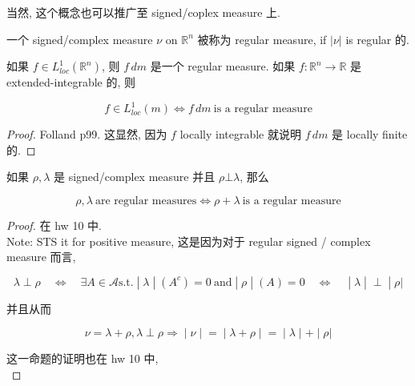 当然, 这个概念也可以推广至 signed/coplex measure 上.

\begin{definition}{}

一个 signed/complex measure \(\nu\) on \(\mathbb{R}^{n}\) 被称为 regular measure, if \(|\nu|\) is regular 的.

\end{definition}

\begin{lemma}

如果 \(f \in L_{loc}^{1}(\mathbb{R}^{n})\), 则 \(f\, dm\) 是一个 regular measure. 如果 \(f:\mathbb{R}^{n}\rightarrow\mathbb{R}\) 是 extended-integrable 的, 则

\[f \in L_{loc}^{1}(m)\Leftrightarrow f\, dm\ \text{is a regular measure}\]

\end{lemma}

\begin{proof}

Folland p99. 这显然, 因为 \(f\) locally integrable 就说明 \(f\, dm\) 是 locally finite 的.

\end{proof}

\begin{lemma}

如果 \(\rho,\lambda\) 是 signed/complex measure 并且 \(\rho\bot\lambda\), 那么

\[\rho,\lambda\ \text{are regular measures}\Leftrightarrow\rho + \lambda\ \text{is a regular measure}\]

\end{lemma}

\begin{proof}

在 hw 10 中.\\
Note: STS it for positive measure, 这是因为对于 regular signed / complex measure 而言,

\[\left. \lambda \perp \rho\quad\Leftrightarrow\quad\exists A \in \mathcal{A}\text{s.t.} \middle| \lambda \middle| (A^{c}) = 0\ \text{and} \middle| \rho \middle| (A) = 0\quad\Leftrightarrow\quad \middle| \lambda \middle| \perp \middle| \rho| \right.\]

并且从而

\[\left. \nu = \lambda + \rho,\lambda \perp \rho\Longrightarrow \middle| \nu \middle| = \middle| \lambda + \rho \middle| = \middle| \lambda \middle| + \middle| \rho| \right.\]

这一命题的证明也在 hw 10 中,\\

\end{proof}

